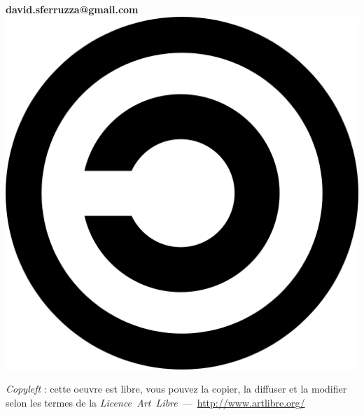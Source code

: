 \begin{titlepage}
~\vfill
\begin{center}
\begin{minipage}[c]{10cm}
\begin{center}
	\textbf{\titre}
	\linebreak
	\linebreak
	\moi\\
	\textbf{david.sferruzza@gmail.com}
	\linebreak
	\linebreak
	\linebreak
	\linebreak
	\includegraphics[scale=.05]{images/copyleft.png} 
	\end{center}
	\textit{Copyleft} : cette oeuvre est libre, vous pouvez la copier,
	la diffuser et la modifier selon les termes de la
	\textit{Licence~Art~Libre}~---~\url{http://www.artlibre.org/}
\end{minipage}
\end{center}
\vfill
\end{titlepage}
